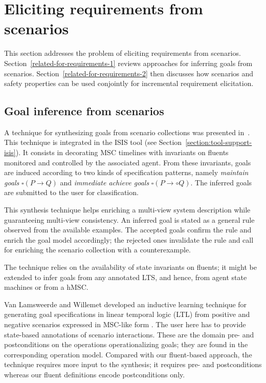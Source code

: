 \section{Eliciting requirements from scenarios\label{section:related-for-requirements}}

This section addresses the problem of eliciting requirements from scenarios. Section~\ref{related-for-requirements-1} reviews approaches for inferring goals from scenarios. Section~\ref{related-for-requirements-2} then discusses how scenarios and safety properties can be used conjointly for incremental requirement elicitation. 

\subsection{Goal inference from scenarios\label{related-for-requirements-1}}

A technique for synthesizing goals from scenario collections was presented in~\cite{Damas:2006, Damas:2011}. This technique is integrated in the ISIS tool (see Section~\ref{section:tool-support-isis}). It consists in decorating MSC timelines with invariants on fluents monitored and controlled by the associated agent. From these invariants, goals are induced according to two kinds of specification patterns, namely \emph{maintain goals} $\square(P \rightarrow Q)$ and \emph{immediate achieve goals} $\square(P \rightarrow \circ Q)$. The inferred goals are submitted to the user for classification.

This synthesis technique helps enriching a multi-view system description while guaranteeing multi-view consistency. An inferred goal is stated as a general rule observed from the available examples. The accepted goals confirm the rule and enrich the goal model accordingly; the rejected ones invalidate the rule and call for enriching the scenario collection with a counterexample. 

The technique relies on the availability of state invariants on fluents; it might be extended to infer goals from any annotated LTS, and hence, from agent state machines or from a hMSC. 

Van Lamsweerde and Willemet developed an inductive learning technique for generating goal specifications in linear temporal logic (LTL) from positive and negative scenarios expressed in MSC-like form \cite{VanLamsweerde:1998}. The user here has to provide state-based annotations of scenario interactions. These are the domain pre- and postconditions on the operations operationalizing goals; they are found in the corresponding operation model. Compared with our fluent-based approach, the technique requires more input to the synthesis; it requires pre- and postconditions whereas our fluent definitions encode postconditions only.

